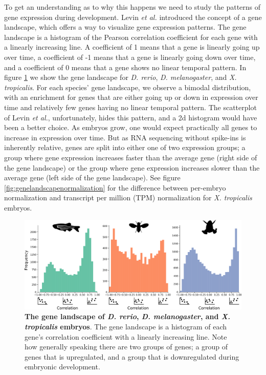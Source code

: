 To get an understanding as to why this happens we need to study the patterns of gene expression during development. Levin \textit{et al.} introduced the concept of a gene landscape, which offers a way to visualize gene expression patterns. The gene landscape is a histogram of the Pearson correlation coefficient for each gene with a linearly increasing line. A coefficient of 1 means that a gene is linearly going up over time, a coefficient of -1 means that a gene is linearly going down over time, and a coefficient of 0 means that a gene shows no linear temporal pattern. In figure \ref{fig:genelandscape} we show the gene landscape for \textit{D. rerio}, \textit{D. melanogaster}, and \textit{X. tropicalis}. For each species' gene landscape, we observe a bimodal distribution, with an enrichment for genes that are either going up or down in expression over time and relatively few genes having no linear temporal pattern. The scatterplot of Levin \textit{et al.}, unfortunately, hides this pattern, and a 2d histogram would have been a better choice. As embryos grow, one would expect practically all genes to increase in expression over time. But as RNA sequencing without spike-ins is inherently relative, genes are split into either one of two expression groups; a group where gene expression increases faster than the average gene (right side of the gene landscape) or the group where gene expression increases slower than the average gene (left side of the gene landscape). See figure \ref{fig:genelandscapenormalization} for the difference between per-embryo normalization and transcript per million (TPM) normalization for \textit{X. tropicalis} embryos.

\begin{figure}[H]
    \includegraphics[width=\linewidth]{ch.hourglass/images/gene_landscape.png}
    \caption{\textbf{The gene landscape of \textit{D. rerio}, \textit{D. melanogaster}, and \textit{X. tropicalis} embryos}. The gene landscape is a histogram of each gene's correlation coefficient with a linearly increasing line. Note how generally speaking there are two groups of genes; a group of genes that is upregulated, and a group that is downregulated during embryonic development.}
    \label{fig:genelandscape}
\end{figure}

